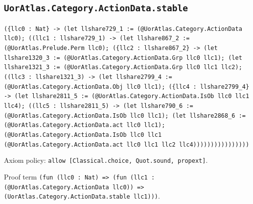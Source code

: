 \documentclass[11pt]{article}
\begin{document}
\subsection*{\texttt{UorAtlas.Category.ActionData.stable}}
\noindent\texttt{(\{llc0 : Nat\} -> (let llshare729\_1 := (@UorAtlas.Category.ActionData llc0); ((llc1 : llshare729\_1) -> (let llshare867\_2 := (@UorAtlas.Prelude.Perm llc0); (\{llc2 : llshare867\_2\} -> (let llshare1320\_3 := (@UorAtlas.Category.ActionData.Grp llc0 llc1); (let llshare1321\_3 := (@UorAtlas.Category.ActionData.Grp llc0 llc1 llc2); ((llc3 : llshare1321\_3) -> (let llshare2799\_4 := (@UorAtlas.Category.ActionData.Obj llc0 llc1); (\{llc4 : llshare2799\_4\} -> (let llshare2811\_5 := (@UorAtlas.Category.ActionData.IsOb llc0 llc1 llc4); ((llc5 : llshare2811\_5) -> (let llshare790\_6 := (@UorAtlas.Category.ActionData.IsOb llc0 llc1); (let llshare2868\_6 := (@UorAtlas.Category.ActionData.act llc0 llc1); (@UorAtlas.Category.ActionData.IsOb llc0 llc1 (@UorAtlas.Category.ActionData.act llc0 llc1 llc2 llc4))))))))))))))))}\par
\noindent Axiom policy: \texttt{allow [Classical.choice, Quot.sound, propext]}.\par
\noindent Proof term \texttt{(fun (llc0 : Nat) => (fun (llc1 : (@UorAtlas.Category.ActionData llc0)) => (UorAtlas.Category.ActionData.stable llc1)))}.\par
\end{document}
